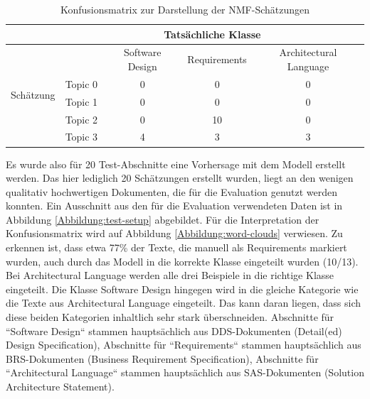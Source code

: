\begin{table}[h]
\centering
\begin{tabular}{|c|c|c|c|c|}
\hline
                           & \multicolumn{4}{c|}{Tatsächliche Klasse}                                  \\ \hline
\multirow{5}{*}{Schätzung} &         & Software Design & Requirements & Architectural Language \\ \cline{2-5} 
                           & Topic 0 & 0               & 0            & 0                      \\ \cline{2-5} 
                           & Topic 1 & 0               & 0            & 0                      \\ \cline{2-5} 
                           & Topic 2 & 0               & 10           & 0                      \\ \cline{2-5} 
                           & Topic 3 & 4               & 3            & 3                      \\ \hline

\end{tabular}
\caption{Konfusionsmatrix zur Darstellung der NMF-Schätzungen}
\label{tab:confusion-nmf}
\end{table}

Es wurde also für 20 Test-Abschnitte eine Vorhersage mit dem Modell erstellt werden. Das hier lediglich 20 Schätzungen erstellt wurden, liegt an den wenigen qualitativ hochwertigen Dokumenten, die für die Evaluation genutzt werden konnten. Ein Ausschnitt aus den für die Evaluation verwendeten Daten ist in Abbildung \ref{Abbildung:test-setup} abgebildet. Für die Interpretation der Konfusionsmatrix wird auf Abbildung \ref{Abbildung:word-clouds} verwiesen. Zu erkennen ist, dass etwa 77\% der Texte, die manuell als Requirements markiert wurden, auch durch das Modell in die korrekte Klasse eingeteilt wurden (10/13). Bei Architectural Language werden alle drei Beispiele in die richtige Klasse eingeteilt. Die Klasse Software Design hingegen wird in die gleiche Kategorie wie die Texte aus Architectural Language eingeteilt. Das kann daran liegen, dass sich diese beiden Kategorien inhaltlich sehr stark überschneiden. Abschnitte für ``Software Design`` stammen hauptsächlich aus DDS-Dokumenten (Detail(ed) Design Specification), Abschnitte für ``Requirements`` stammen hauptsächlich aus BRS-Dokumenten (Business Requirement Specification), Abschnitte für ``Architectural Language`` stammen hauptsächlich aus SAS-Dokumenten (Solution Architecture Statement). 

